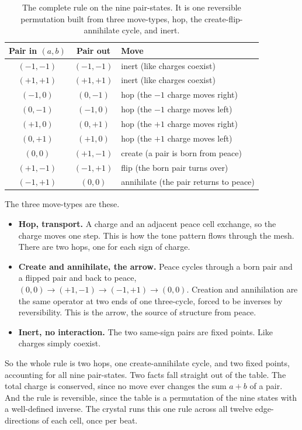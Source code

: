 \begin{table}[h]
\centering
\begin{tabular}{ccl}
\toprule
Pair in $(a,b)$ & Pair out & Move \\
\midrule
$(-1,-1)$ & $(-1,-1)$ & inert (like charges coexist) \\
$(+1,+1)$ & $(+1,+1)$ & inert (like charges coexist) \\
$(-1,0)$ & $(0,-1)$ & hop (the $-1$ charge moves right) \\
$(0,-1)$ & $(-1,0)$ & hop (the $-1$ charge moves left) \\
$(+1,0)$ & $(0,+1)$ & hop (the $+1$ charge moves right) \\
$(0,+1)$ & $(+1,0)$ & hop (the $+1$ charge moves left) \\
$(0,0)$ & $(+1,-1)$ & create (a pair is born from peace) \\
$(+1,-1)$ & $(-1,+1)$ & flip (the born pair turns over) \\
$(-1,+1)$ & $(0,0)$ & annihilate (the pair returns to peace) \\
\bottomrule
\end{tabular}
\caption{The complete rule on the nine pair-states. It is one reversible permutation built from three move-types, hop, the create-flip-annihilate cycle, and inert.}
\label{tab:rule}
\end{table}

The three move-types are these.

\begin{itemize}
  \item \textbf{Hop, transport.} A charge and an adjacent peace cell exchange, so the charge moves one step. This is how the tone pattern flows through the mesh. There are two hops, one for each sign of charge.
  \item \textbf{Create and annihilate, the arrow.} Peace cycles through a born pair and a flipped pair and back to peace, $(0,0) \to (+1,-1) \to (-1,+1) \to (0,0)$. Creation and annihilation are the same operator at two ends of one three-cycle, forced to be inverses by reversibility. This is the arrow, the source of structure from peace.
  \item \textbf{Inert, no interaction.} The two same-sign pairs are fixed points. Like charges simply coexist.
\end{itemize}

So the whole rule is two hops, one create-annihilate cycle, and two fixed points, accounting for all nine pair-states. Two facts fall straight out of the table. The total charge is conserved, since no move ever changes the sum $a + b$ of a pair. And the rule is reversible, since the table is a permutation of the nine states with a well-defined inverse. The crystal runs this one rule across all twelve edge-directions of each cell, once per beat.

